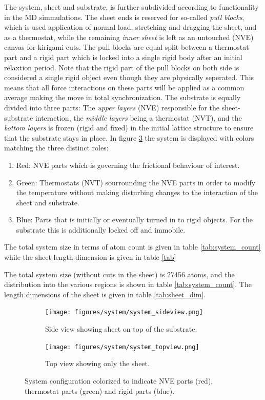 The system, sheet and substrate, is further subdivided according to
functionality in the MD simmulations. The sheet ends is reserved for so-called
\textit{pull blocks}, which is used application of normal load, stretching and
dragging the sheet, and as a thermostat, while the remaining \textit{inner
sheet} is left as an untouched (NVE) canvas for kirigami cuts. The pull blocks
are equal split between a thermostat part and a rigid part which is locked into
a single rigid body after an initial relaxtion period. Note that the rigid part
of the pull blocks on both side is considered a single rigid object even though
they are physically seperated. This means that all force interactions on these
parts will be applied as a common average making the move in total
synchronization. The substrate is equally divided into three parts: The
\textit{upper layers} (NVE) responsible for the sheet-substrate interaction, the
\textit{middle layers} being a thermostat (NVT), and the \textit{bottom layers}
is frozen (rigid and fixed) in the initial lattice structure to ensure that the
substrate stays in place. In figure \ref{fig:system} the system is displayed
with colors matching the three distinct roles:
\begin{enumerate}
  \item Red: NVE parts which is governing the frictional behaviour of interest.
  \item Green: Thermostats (NVT) sourrounding the NVE parts in order to modify the temperature without making disturbing changes to the interaction of the sheet and substrate.
  \item Blue: Parts that is initially or eventually turned in to rigid objects. For the substrate this is additionally locked off and immobile. 
\end{enumerate}

The total system size in terms of atom count is given in table \ref{tab:system_count} while the sheet length dimension is given in table \ref{tab}

The total system size (without cuts in the sheet) is 27456 atoms, and the distribution into the various regions is shown in table \ref{tab:system_count}. The length dimensions of the sheet is given in table \ref{tab:sheet_dim}.

\begin{figure}[H]
  \centering
  \begin{subfigure}[b]{0.80\textwidth}
      \centering
      \texttt{[image: figures/system/system\_sideview.png]}
      \caption{Side view showing sheet on top of the substrate.}
      \label{fig:sideview}
  \end{subfigure}
  \hfill
  \begin{subfigure}[b]{0.80\textwidth}
      \centering
      \texttt{[image: figures/system/system\_topview.png]}
      \caption{Top view showing only the sheet.}
      \label{fig:topview}
  \end{subfigure}
  \hfill
     \caption{System configuration colorized to indicate NVE parts (red), thermostat parts (green) and rigid parts (blue).}
     \label{fig:system}
\end{figure}

